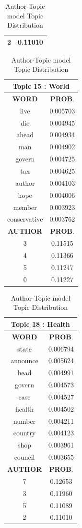 \begin{table}[h!]
\begin{tabular}{|c c|}
2 &   0.11010  \\
 \hline
 \end{tabular} 
\hfill
 \begin{tabular}{|c c|} 
\hline
\multicolumn{2}{|c|}{\textbf{Topic 15 : World}} \\
\hline
 \textbf{WORD} & \textbf{PROB}.  \\ [0.3ex] 
 \hline
 live  & 0.005703\\ 
	die   &  0.004945\\ 
	ahead  &   0.004934\\ 
	man   &  0.004902\\ 
	govern  &   0.004725\\ 
	tax   &  0.004625\\ 
	author  &   0.004103\\ 
	hope   &  0.004006\\ 
	member  &   0.003923\\ 
	conservative  &   0.003762\\ [1ex] 
 \hline
  \textbf{AUTHOR} & \textbf{PROB}.  \\ [0.3ex] 
 \hline
 3 &   0.11515 \\
4  &    0.11366 \\
5   &   0.11247 \\
0  &    0.11227  \\
 \hline
 \end{tabular} 
\hfill
\begin{tabular}{|c c|} 
\hline
\multicolumn{2}{|c|}{\textbf{Topic 18 : Health}} \\
\hline
 \textbf{WORD} & \textbf{PROB}.  \\ [0.3ex] 
 \hline
 state &  0.006794 \\ 
	announce  &   0.005624 \\ 
	head  &   0.004991 \\ 
	govern &    0.004573 \\ 
	case &    0.004527 \\ 
	health &    0.004502 \\ 
	number &    0.004211 \\ 
	country&    0.004123 \\ 
	shop  &   0.003961 \\ 
	council &  0.003655 \\ [1ex] 
 \hline
  \textbf{AUTHOR} & \textbf{PROB}.  \\ [0.3ex] 
 \hline
 7 &  0.12653 \\
3 &   0.11960 \\
5 &   0.11089 \\
2 &   0.11010  \\
 \hline
 \end{tabular} 
\hfill
\caption{Author-Topic model Topic Distribution}
\label{table:at_topic_distribution}
\end{table}

